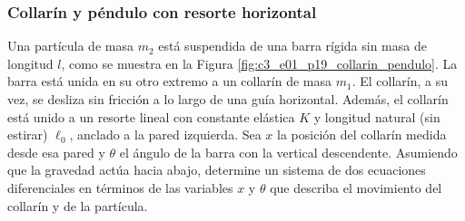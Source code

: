 \subsubsection{Collarín y péndulo con resorte horizontal}

Una partícula de masa $m_2$ está suspendida de una barra rígida sin masa de longitud $l$, como se muestra en la Figura \ref{fig:c3_e01_p19_collarin_pendulo}. La barra está unida en su otro extremo a un collarín de masa $m_1$. El collarín, a su vez, se desliza sin fricción a lo largo de una guía horizontal. Además, el collarín está unido a un resorte lineal con constante elástica $K$ y longitud natural (sin estirar) $\ell_0$, anclado a la pared izquierda. Sea $x$ la posición del collarín medida desde esa pared y $\theta$ el ángulo de la barra con la vertical descendente. Asumiendo que la gravedad actúa hacia abajo, determine un sistema de dos ecuaciones diferenciales en términos de las variables $x$ y $\theta$ que describa el movimiento del collarín y de la partícula.

